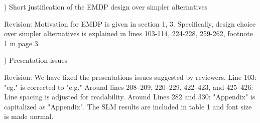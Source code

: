 \documentclass[11pt]{article}
\newcommand{\method}{OPTiMACS\xspace}
\begin{document}
) Short justification of the EMDP design over simpler alternatives

Revision: Motivation for EMDP is given in section 1, 3. Specifically, design choice over simpler alternatives is explained in lines 103-114, 224-228, 259-262, footnote 1 in page 3.

) Presentation issues

Revision: We have fixed the presentations issues suggested by reviewers. 
Line 103: "eg." is corrected to "e.g."
Around lines 208–209, 220–229, 422–423, and 425–426: Line spacing is adjusted for readability.
Around Lines 282 and 330: "Appendix" is capitalized as "Appendix".
The SLM results are included in table 1 and font size is made normal.


% 
% 
% 
% 
% 
% 
% 

\end{document}
